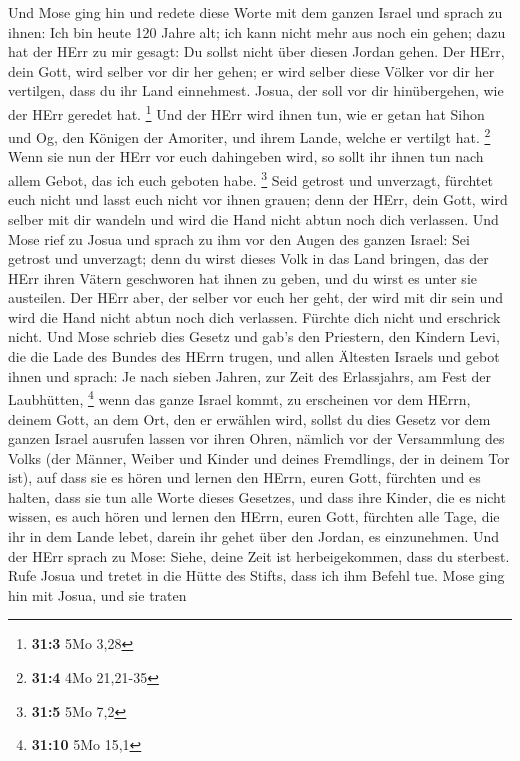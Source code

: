  Und Mose ging hin und redete diese Worte mit dem ganzen
Israel  und sprach zu ihnen: Ich bin heute 120 Jahre alt;
ich kann nicht mehr aus noch ein gehen; dazu hat der HErr zu mir gesagt:
Du sollst nicht über diesen Jordan gehen.  Der HErr, dein
Gott, wird selber vor dir her gehen; er wird selber diese Völker vor dir
her vertilgen, dass du ihr Land einnehmest. Josua, der soll vor dir
hinübergehen, wie der HErr geredet hat. \footnote{\textbf{31:3} 5Mo 3,28}
 Und der HErr wird ihnen tun, wie er getan hat Sihon und
Og, den Königen der Amoriter, und ihrem Lande, welche er vertilgt hat.
\footnote{\textbf{31:4} 4Mo 21,21-35}  Wenn sie nun der
HErr vor euch dahingeben wird, so sollt ihr ihnen tun nach allem Gebot,
das ich euch geboten habe. \footnote{\textbf{31:5} 5Mo 7,2}
 Seid getrost und unverzagt, fürchtet euch nicht und lasst
euch nicht vor ihnen grauen; denn der HErr, dein Gott, wird selber mit
dir wandeln und wird die Hand nicht abtun noch dich verlassen.
 Und Mose rief zu Josua und sprach zu ihm vor den Augen
des ganzen Israel: Sei getrost und unverzagt; denn du wirst dieses Volk
in das Land bringen, das der HErr ihren Vätern geschworen hat ihnen zu
geben, und du wirst es unter sie austeilen.  Der HErr
aber, der selber vor euch her geht, der wird mit dir sein und wird die
Hand nicht abtun noch dich verlassen. Fürchte dich nicht und erschrick
nicht.  Und Mose schrieb dies Gesetz und gab's den
Priestern, den Kindern Levi, die die Lade des Bundes des HErrn trugen,
und allen Ältesten Israels  und gebot ihnen und sprach:
Je nach sieben Jahren, zur Zeit des Erlassjahrs, am Fest der Laubhütten,
\footnote{\textbf{31:10} 5Mo 15,1}  wenn das ganze Israel
kommt, zu erscheinen vor dem HErrn, deinem Gott, an dem Ort, den er
erwählen wird, sollst du dies Gesetz vor dem ganzen Israel ausrufen
lassen vor ihren Ohren,  nämlich vor der Versammlung des
Volks (der Männer, Weiber und Kinder und deines Fremdlings, der in
deinem Tor ist), auf dass sie es hören und lernen den HErrn, euren Gott,
fürchten und es halten, dass sie tun alle Worte dieses Gesetzes,
 und dass ihre Kinder, die es nicht wissen, es auch hören
und lernen den HErrn, euren Gott, fürchten alle Tage, die ihr in dem
Lande lebet, darein ihr gehet über den Jordan, es einzunehmen.
 Und der HErr sprach zu Mose: Siehe, deine Zeit ist
herbeigekommen, dass du sterbest. Rufe Josua und tretet in die Hütte des
Stifts, dass ich ihm Befehl tue. Mose ging hin mit Josua, und sie traten
